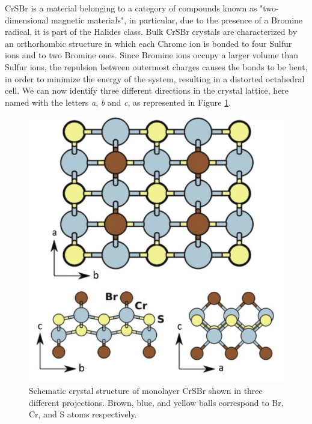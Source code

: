 \documentclass[journal]{IEEEtran}
\begin{document}
 CrSBr is a material belonging to a category of compounds known as "two-dimensional magnetic materials", in particular, due to the presence of a Bromine radical, it is part of the Halides class.
 Bulk CrSBr crystals are characterized by an orthorhombic structure in which each Chrome ion is bonded to four Sulfur ions and to two Bromine ones. Since Bromine ions occupy a larger volume than Sulfur ions, the repulsion between outermost charges causes the bonds to be bent, in order to minimize the energy of the system, resulting in a distorted octahedral cell.
 We can now identify three different directions in the crystal lattice, here named with the letters \textit{a}, \textit{b} and \textit{c}, as represented in Figure \ref{fig:reticolo_sample}.

\begin{figure}[h!]
    \centering
    \includegraphics[scale=0.25]{lab2-reticolo.png}
    \caption{Schematic crystal structure of monolayer CrSBr
shown in three different projections. Brown, blue, and yellow balls correspond to Br, Cr, and S atoms respectively.}
    \label{fig:reticolo_sample}
\end{figure}
\end{document}
